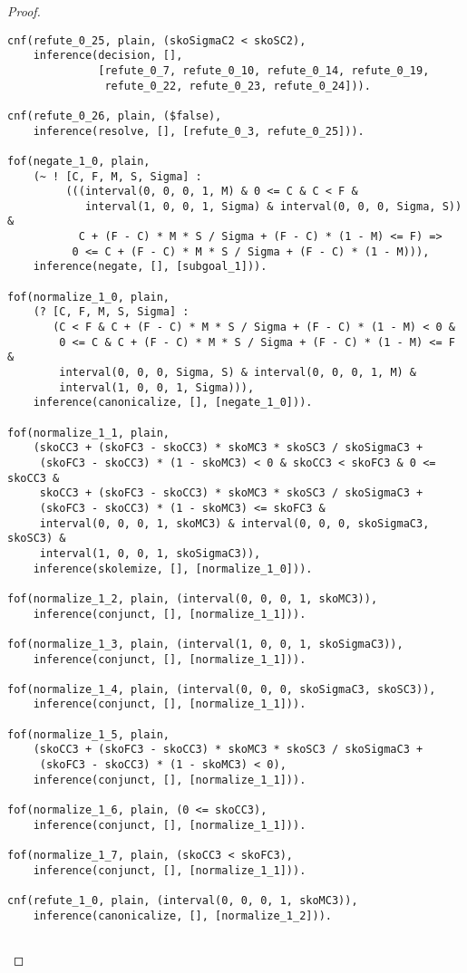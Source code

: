 \begin{proof}
\begin{verbatim}
cnf(refute_0_25, plain, (skoSigmaC2 < skoSC2),
    inference(decision, [],
              [refute_0_7, refute_0_10, refute_0_14, refute_0_19,
               refute_0_22, refute_0_23, refute_0_24])).

cnf(refute_0_26, plain, ($false),
    inference(resolve, [], [refute_0_3, refute_0_25])).

fof(negate_1_0, plain,
    (~ ! [C, F, M, S, Sigma] :
         (((interval(0, 0, 0, 1, M) & 0 <= C & C < F &
            interval(1, 0, 0, 1, Sigma) & interval(0, 0, 0, Sigma, S)) &
           C + (F - C) * M * S / Sigma + (F - C) * (1 - M) <= F) =>
          0 <= C + (F - C) * M * S / Sigma + (F - C) * (1 - M))),
    inference(negate, [], [subgoal_1])).

fof(normalize_1_0, plain,
    (? [C, F, M, S, Sigma] :
       (C < F & C + (F - C) * M * S / Sigma + (F - C) * (1 - M) < 0 &
        0 <= C & C + (F - C) * M * S / Sigma + (F - C) * (1 - M) <= F &
        interval(0, 0, 0, Sigma, S) & interval(0, 0, 0, 1, M) &
        interval(1, 0, 0, 1, Sigma))),
    inference(canonicalize, [], [negate_1_0])).

fof(normalize_1_1, plain,
    (skoCC3 + (skoFC3 - skoCC3) * skoMC3 * skoSC3 / skoSigmaC3 +
     (skoFC3 - skoCC3) * (1 - skoMC3) < 0 & skoCC3 < skoFC3 & 0 <= skoCC3 &
     skoCC3 + (skoFC3 - skoCC3) * skoMC3 * skoSC3 / skoSigmaC3 +
     (skoFC3 - skoCC3) * (1 - skoMC3) <= skoFC3 &
     interval(0, 0, 0, 1, skoMC3) & interval(0, 0, 0, skoSigmaC3, skoSC3) &
     interval(1, 0, 0, 1, skoSigmaC3)),
    inference(skolemize, [], [normalize_1_0])).

fof(normalize_1_2, plain, (interval(0, 0, 0, 1, skoMC3)),
    inference(conjunct, [], [normalize_1_1])).

fof(normalize_1_3, plain, (interval(1, 0, 0, 1, skoSigmaC3)),
    inference(conjunct, [], [normalize_1_1])).

fof(normalize_1_4, plain, (interval(0, 0, 0, skoSigmaC3, skoSC3)),
    inference(conjunct, [], [normalize_1_1])).

fof(normalize_1_5, plain,
    (skoCC3 + (skoFC3 - skoCC3) * skoMC3 * skoSC3 / skoSigmaC3 +
     (skoFC3 - skoCC3) * (1 - skoMC3) < 0),
    inference(conjunct, [], [normalize_1_1])).

fof(normalize_1_6, plain, (0 <= skoCC3),
    inference(conjunct, [], [normalize_1_1])).

fof(normalize_1_7, plain, (skoCC3 < skoFC3),
    inference(conjunct, [], [normalize_1_1])).

cnf(refute_1_0, plain, (interval(0, 0, 0, 1, skoMC3)),
    inference(canonicalize, [], [normalize_1_2])).


\end{verbatim}
\end{proof}
